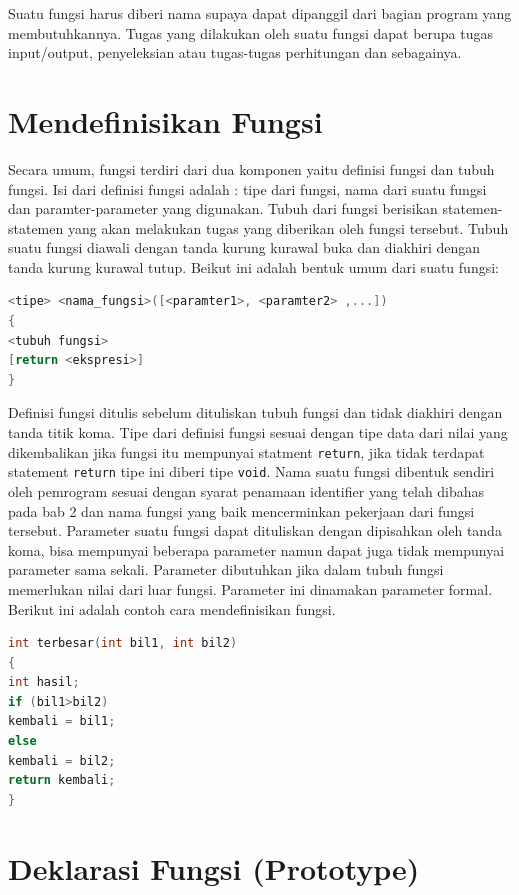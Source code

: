 Suatu fungsi harus diberi nama supaya dapat dipanggil dari bagian
program yang membutuhkannya. Tugas yang dilakukan oleh suatu fungsi
dapat berupa tugas input/output, penyeleksian atau tugas-tugas
perhitungan dan sebagainya.

\section{Mendefinisikan Fungsi}\label{mendefinisikan-fungsi}

Secara umum, fungsi terdiri dari dua komponen yaitu definisi fungsi dan
tubuh fungsi. Isi dari definisi fungsi adalah : tipe dari fungsi, nama
dari suatu fungsi dan paramter-parameter yang digunakan. Tubuh dari
fungsi berisikan statemen-statemen yang akan melakukan tugas yang
diberikan oleh fungsi tersebut. Tubuh suatu fungsi diawali dengan tanda
kurung kurawal buka dan diakhiri dengan tanda kurung kurawal tutup.
Beikut ini adalah bentuk umum dari suatu fungsi:

\begin{lstlisting}[language=c++, numbers=none]
<tipe> <nama_fungsi>([<paramter1>, <paramter2> ,...])
{
<tubuh fungsi>
[return <ekspresi>]
}
\end{lstlisting}

Definisi fungsi ditulis sebelum dituliskan tubuh fungsi dan tidak
diakhiri dengan tanda titik koma. Tipe dari definisi fungsi sesuai
dengan tipe data dari nilai yang dikembalikan jika fungsi itu mempunyai
statment \texttt{return}, jika tidak terdapat statement \texttt{return}
tipe ini diberi tipe \texttt{void}. Nama suatu fungsi dibentuk sendiri
oleh pemrogram sesuai dengan syarat penamaan identifier yang telah
dibahas pada bab 2 dan nama fungsi yang baik mencerminkan pekerjaan dari
fungsi tersebut. Parameter suatu fungsi dapat dituliskan dengan
dipisahkan oleh tanda koma, bisa mempunyai beberapa parameter namun
dapat juga tidak mempunyai parameter sama sekali. Parameter dibutuhkan
jika dalam tubuh fungsi memerlukan nilai dari luar fungsi. Parameter ini
dinamakan parameter formal. Berikut ini adalah contoh cara
mendefinisikan fungsi.

\begin{lstlisting}[language=c++, numbers=none]
int terbesar(int bil1, int bil2)
{
int hasil;
if (bil1>bil2)
kembali = bil1;
else
kembali = bil2;
return kembali;
}
\end{lstlisting}

\section{Deklarasi Fungsi
(Prototype)}\label{deklarasi-fungsi-prototype}

